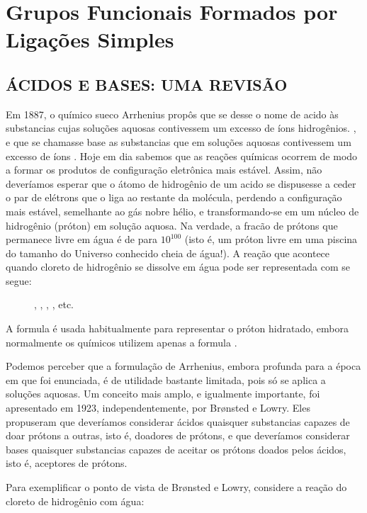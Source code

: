 \chapter{Grupos Funcionais Formados por Ligações Simples}
\section{ÁCIDOS E BASES: UMA REVISÃO}

Em 1887, o químico sueco Arrhenius propôs que se desse o nome de acido às substancias cujas soluções aquosas contivessem um excesso de íons hidrogênios. , e que se chamasse base as substancias que em soluções aquosas contivessem um excesso de íons . Hoje em dia sabemos que as reações químicas ocorrem de modo a formar os produtos de configuração eletrônica mais estável. Assim, não deveríamos esperar que o átomo de hidrogênio de um acido se dispusesse a ceder o par de elétrons que o liga ao restante da molécula, perdendo a configuração mais estável, semelhante ao gás nobre hélio, e transformando-se em um núcleo de hidrogênio (próton) em solução aquosa. Na verdade, a fracão de prótons que permanece livre em água é de para $10^{100}$ (isto é, um próton livre em uma piscina do tamanho do Universo conhecido cheia de água!). A reação que acontece quando cloreto de hidrogênio se dissolve em água pode ser representada com se segue: 

\begin{figure}[H]
    \centering
    , , , , etc. 
\end{figure}

\noindent A formula  é usada habitualmente para representar o próton hidratado, embora normalmente os químicos utilizem apenas a formula .

Podemos perceber que a formulação de Arrhenius, embora profunda para a época em que foi enunciada, é de utilidade bastante limitada, pois só se aplica a soluções aquosas. Um conceito mais amplo, e igualmente importante, foi apresentado em 1923, independentemente, por Br{\o}nsted e Lowry. Eles propuseram que deveríamos considerar ácidos quaisquer substancias capazes de doar prótons a outras, isto é, doadores de prótons, e que deveríamos considerar bases quaisquer substancias capazes de aceitar os prótons doados pelos ácidos, isto é, aceptores de prótons.

Para exemplificar o ponto de vista de Br{\o}nsted e Lowry, considere a reação do cloreto de hidrogênio com água:

